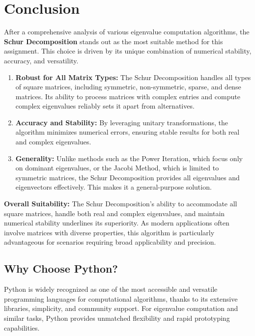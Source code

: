 \documentclass[12pt]{article}
\begin{document}
\section*{\color{blue}Conclusion}
After a comprehensive analysis of various eigenvalue computation algorithms, the \textbf{Schur Decomposition} stands out as the most suitable method for this assignment. This choice is driven by its unique combination of numerical stability, accuracy, and versatility.

\begin{tcolorbox}[colback=lightgray!10, colframe=teal, title=Key Advantages]
\begin{enumerate}
    \item \textbf{Robust for All Matrix Types:} The Schur Decomposition handles all types of square matrices, including symmetric, non-symmetric, sparse, and dense matrices. Its ability to process matrices with complex entries and compute complex eigenvalues reliably sets it apart from alternatives.
    \item \textbf{Accuracy and Stability:} By leveraging unitary transformations, the algorithm minimizes numerical errors, ensuring stable results for both real and complex eigenvalues.
    \item \textbf{Generality:} Unlike methods such as the Power Iteration, which focus only on dominant eigenvalues, or the Jacobi Method, which is limited to symmetric matrices, the Schur Decomposition provides all eigenvalues and eigenvectors effectively. This makes it a general-purpose solution.
\end{enumerate}
\end{tcolorbox}

\textbf{Overall Suitability:} The Schur Decomposition's ability to accommodate all square matrices, handle both real and complex eigenvalues, and maintain numerical stability underlines its superiority. As modern applications often involve matrices with diverse properties, this algorithm is particularly advantageous for scenarios requiring broad applicability and precision.

\subsection*{Why Choose Python?}
Python is widely recognized as one of the most accessible and versatile programming languages for computational algorithms, thanks to its extensive libraries, simplicity, and community support. For eigenvalue computation and similar tasks, Python provides unmatched flexibility and rapid prototyping capabilities.
\end{document}
